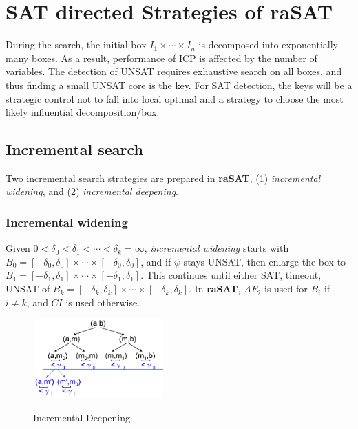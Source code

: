 \documentclass[runningheads,a4paper,oribibl]{llncs}
\begin{document}
\section{SAT directed Strategies of {\bf raSAT}} \label{sec:strategy}

During the search, the initial box 
$I_1 \times \cdots \times I_n$ is decomposed into exponentially many boxes. As a result, performance of ICP is affected by the number of variables. 
The detection of UNSAT requires exhaustive search on all boxes, and thus finding a small UNSAT core
is the key. 
For SAT detection, the keys will be a strategic control not to fall into local optimal and
a strategy to choose the most likely influential decomposition/box. 

\subsection{Incremental search} \label{sec:incsearch}

Two incremental search strategies are prepared in {\bf raSAT}, 
(1) {\em incremental widening}, and (2) {\em incremental deepening}. 

\subsubsection*{Incremental widening}
Given $0 < \delta_0 < \delta_1 < \cdots < \delta_k = \infty$, 
{\em incremental widening} starts with 
$B_0 =
[-\delta_0 , \delta_0] \times \cdots \times [-\delta_0 , \delta_0]$,
and if $\psi$ stays  UNSAT, then enlarge the box to 
$B_1 =
[-\delta_1 , \delta_1] \times \cdots \times [-\delta_1 , \delta_1]$. This continues until either SAT, timeout, UNSAT of
$B_k=
[-\delta_k , \delta_k] \times \cdots \times [-\delta_k , \delta_k]$. 
%
In {\bf raSAT}, $AF_2$ is used for $B_i$ if $i \neq k$, and $CI$ is used otherwise.



\begin{figure}[ht]
\begin{minipage}[b]{1.0\linewidth}
\centering
\includegraphics[height=1.2in,width=2in]{IncDeepen.png} \\
\caption{Incremental Deepening}
\label{fig:incwid}
\end{minipage}
\end{figure}
\end{document}

